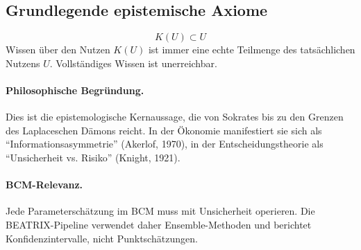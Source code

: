 \subsection{Grundlegende epistemische Axiome}

\begin{axiom}
\begin{equation}
K(U) \subset U
\end{equation}
Wissen über den Nutzen $K(U)$ ist immer eine echte Teilmenge des tatsächlichen Nutzens $U$. Vollständiges Wissen ist unerreichbar.

\paragraph{Philosophische Begründung.}
Dies ist die epistemologische Kernaussage, die von Sokrates bis zu den Grenzen des Laplaceschen Dämons reicht. In der Ökonomie manifestiert sie sich als ``Informationsasymmetrie'' (Akerlof, 1970), in der Entscheidungstheorie als ``Unsicherheit vs. Risiko'' (Knight, 1921).

\paragraph{BCM-Relevanz.}
Jede Parameterschätzung im BCM muss mit Unsicherheit operieren. Die BEATRIX-Pipeline verwendet daher Ensemble-Methoden und berichtet Konfidenzintervalle, nicht Punktschätzungen.
\end{axiom}

